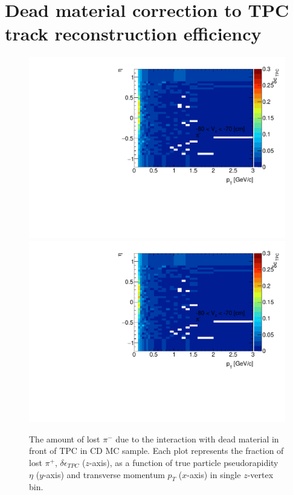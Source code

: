 
\chapter{Dead material correction to TPC track reconstruction efficiency}\label{appendix:deadMaterial}
\begin{figure}[hb]
	\caption[The amount of lost $\pi^+$ due to the interaction with dead material in front of TPC as a function of $p_T$, $\eta$ and $z$-vertex in CD]{The amount of lost $\pi^-$ due to the interaction with dead material in front of TPC in CD MC sample. Each plot represents the fraction of lost $\pi^+$, $\delta\epsilon_{ TPC}$ ($z$-axis), as a function of true particle pseudorapidity $\eta$ ($y$-axis) and transverse momentum $p_{T}$ ($x$-axis) in single $z$-vertex bin.}\label{fig:dead_materialCD3Dpip}
	\centering
	\parbox{0.325\textwidth}{
		\centering
		\includegraphics[width=\linewidth,page=49]{graphics/systematicsEfficiency/deadMaterial/secondaries_Unbinned_CD_.pdf}\\
		\includegraphics[width=\linewidth,page=52]{graphics/systematicsEfficiency/deadMaterial/secondaries_Unbinned_CD_.pdf}\\
}
\end{figure}
